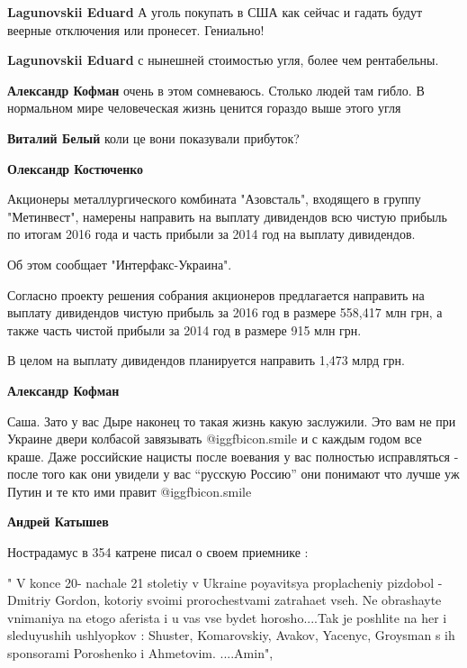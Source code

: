 \begin{itemize}
\begin{itemize}
\textbf{Lagunovskii Eduard} А уголь покупать в США как сейчас и гадать будут веерные отключения или пронесет. Гениально!

\textbf{Lagunovskii Eduard} с нынешней стоимостью угля, более чем рентабельны.

\textbf{Александр Кофман} очень в этом сомневаюсь. Столько людей там гибло. В нормальном мире человеческая жизнь ценится гораздо выше этого угля

\textbf{Виталий Белый} коли це вони показували прибуток?

\textbf{Олександр Костюченко} 

Акционеры металлургического комбината "Азовсталь", входящего в группу
"Метинвест", намерены направить на выплату дивидендов всю чистую прибыль по
итогам 2016 года и часть прибыли за 2014 год на выплату дивидендов.

Об этом сообщает "Интерфакс-Украина".

Согласно проекту решения собрания акционеров предлагается направить на выплату
дивидендов чистую прибыль за 2016 год в размере 558,417 млн грн, а также часть
чистой прибыли за 2014 год в размере 915 млн грн.

В целом на выплату дивидендов планируется направить 1,473 млрд грн.

\textbf{Александр Кофман} 

Саша. Зато у вас Дыре наконец то такая жизнь какую заслужили. Это вам не при
Украине двери колбасой завязывать  @igg{fbicon.smile}  и с каждым годом все краше. Даже
российские нацисты после воевания у вас полностью исправляться - после того как
они увидели у вас \enquote{русскую Россию} они понимают что лучше уж Путин и те кто ими
правит  @igg{fbicon.smile} 

\end{itemize} %

\textbf{Андрей Катышев}

Нострадамус в 354 катрене писал о своем приемнике :

" V konce 20- nachale 21 stoletiy v Ukraine poyavitsya proplacheniy pizdobol
-Dmitriy Gordon, kotoriy svoimi prorochestvami zatrahaet vseh. Ne obrashayte
vnimaniya na etogo aferista i u vas vse bydet horosho....Tak je poshlite na her
i sleduyushih ushlyopkov : Shuster, Komarovskiy, Avakov, Yacenyc, Groysman s ih
sponsorami Poroshenko i Ahmetovim. ....Amin",


\end{itemize}
